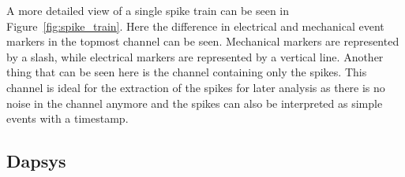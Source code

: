 A more detailed view of a single spike train can be seen in Figure~\ref{fig:spike_train}. Here the difference in electrical and mechanical event markers in the topmost channel can be seen. Mechanical markers are represented by a slash, while electrical markers are represented by a vertical line. Another thing that can be seen here is the channel containing only the spikes. This channel is ideal for the extraction of the spikes for later analysis as there is no noise in the channel anymore and the spikes can also be interpreted as simple events with a timestamp.

\subsection{Dapsys}

